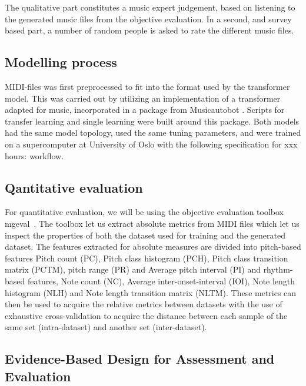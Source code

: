 \documentclass{IEEEtran}
\begin{document}
The qualitative part constitutes a music expert judgement, based on listening
to the generated music files from the objective evaluation. In a second, and
survey based part, a number of random people is asked to rate the different
music files.

\subsection{Modelling process} MIDI-files was first preprocessed to fit into
the format used by the transformer model. This was carried out by utilizing
an implementation of a transformer adapted for music, incorporated in a
package from Musicautobot \cite{musicautobot}. Scripts for transfer learning
and single learning were built around this package. Both models had the same
model topology, used the same tuning parameters, and were trained on a
supercomputer at University of Oslo with the following specification for xxx
hours: %
workflow.

\subsection{Qantitative evaluation}

For quantitative evaluation, we will be using the objective evaluation
toolbox mgeval~\cite{yang2020evaluation}. The toolbox let us extract absolute
metrics from MIDI files which let us inspect the properties of both the
dataset used for training and the generated dataset. The features extracted
for absolute measures are divided into pitch-based features Pitch count (PC),
Pitch class histogram (PCH), Pitch class transition matrix (PCTM), pitch
range (PR) and Average pitch interval (PI) and rhythm-based features, Note
count (NC), Average inter-onset-interval (IOI), Note length histogram (NLH)
and Note length transition matrix (NLTM). These metrics can then be used to
acquire the relative metrics between datasets with the use of exhaustive
cross-validation to acquire the distance between each sample of the same set
(intra-dataset) and another set (inter-dataset).

\subsection{Evidence-Based Design for Assessment and Evaluation}
\end{document}
